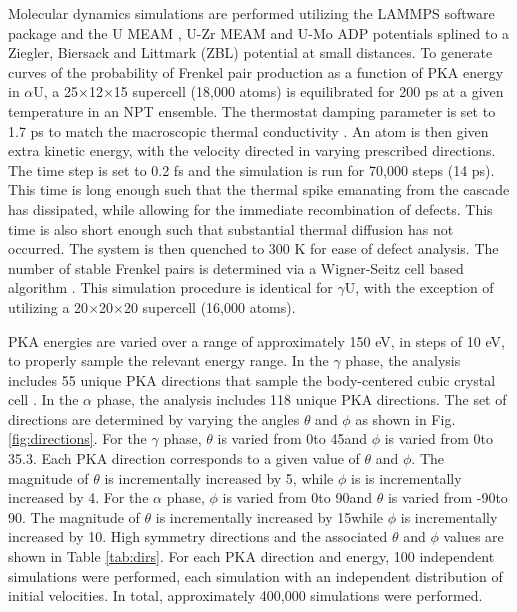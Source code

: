 \documentclass[review]{elsarticle}
\begin{document}
Molecular dynamics simulations are performed utilizing the LAMMPS \cite{plimpton1995} software package and the U MEAM \cite{beeler_meam}, U-Zr MEAM \cite{moore2015} and U-Mo ADP \cite{smirnovaADP} potentials splined to a Ziegler, Biersack and Littmark (ZBL) \cite{zbl} potential at small distances. To generate curves of the probability of Frenkel pair production as a function of PKA energy in $\alpha$U, a 25$\times$12$\times$15 supercell (18,000 atoms) is equilibrated for 200 ps at a given temperature in an NPT ensemble. The thermostat damping parameter is set to 1.7 ps to match the macroscopic thermal conductivity \cite{lane2012}. An atom is then given extra kinetic energy, with the velocity directed in varying prescribed directions. The time step is set to 0.2 fs and the simulation is run for 70,000 steps (14 ps). This time is long enough such that the thermal spike emanating from the cascade has dissipated, while allowing for the immediate recombination of defects. This time is also short enough such that substantial thermal diffusion has not occurred. The system is then quenched to 300 K for ease of defect analysis. The number of stable Frenkel pairs is determined via a Wigner-Seitz cell based algorithm \cite{hayward2010}. This simulation procedure is identical for $\gamma$U, with the exception of utilizing a 20$\times$20$\times$20 supercell (16,000 atoms). 

PKA energies are varied over a range of approximately 150 eV, in steps of 10 eV, to properly sample the relevant energy range. In the $\gamma$ phase, the analysis includes 55 unique PKA directions that sample the body-centered cubic crystal cell \cite{beeler2015}. In the $\alpha$ phase, the analysis includes 118 unique PKA directions. The set of directions are determined by varying the angles $\theta$ and $\phi$ as shown in Fig. \ref{fig:directions}. For the $\gamma$ phase, $\theta$ is varied from 0\degree to 45\degree and $\phi$ is varied from 0\degree to 35.3\degree. Each PKA direction corresponds to a given value of $\theta$ and $\phi$. The magnitude of $\theta$ is incrementally increased by 5\degree, while $\phi$ is is incrementally increased by 4\degree. For the $\alpha$ phase, $\phi$ is varied from 0\degree to 90\degree and $\theta$ is varied from -90\degree to 90\degree. The magnitude of $\theta$ is incrementally increased by 15\degree  while $\phi$ is incrementally increased by 10\degree. High symmetry directions and the associated $\theta$ and $\phi$ values are shown in Table \ref{tab:dirs}. For each PKA direction and energy, 100 independent simulations were performed, each simulation with an independent distribution of initial velocities. In total, approximately 400,000 simulations were performed. 
\end{document}

